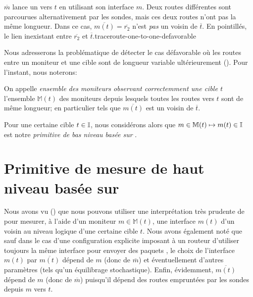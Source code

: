  {$\overline{m}$ lance un \traceroute vers $t$ en
utilisant son interface $m$.
Deux routes différentes sont parcourues alternativement par les sondes, mais ces deux routes
n'ont pas la même longueur. Dans ce cas, $\overline{m(t)} = \overline{r_2}$
n'est {\em pas} un voisin de $\overline{t}$. En pointillés, le lien inexistant
entre $\overline{r_2}$ et $\overline{t}$.}{traceroute-one-to-one-defavorable}

Nous adresserons la problématique de détecter le cas défavorable où les routes
entre un moniteur et une cible sont de longueur variable ultérieurement
(). Pour l'instant, nous noterons:

\begin{definition} On
appelle {\em ensemble des moniteurs observant correctemment une cible $t$}
l'ensemble $\mathbb{M}(t)$ des moniteurs depuis lesquels toutes les routes vers
$t$ sont de même longueur; en particulier tels que $\overline{m(t)}$ est un
voisin de $\overline{t}$.
\end{definition} 

Pour une certaine cible $t \in \mathbb{I}$, nous considérons alors que $m \in
{\mathbb{M}(t)} \mapsto m(t) \in \mathbb{I}$ est notre {\em primitive de bas niveau
basée sur \traceroute}.

\section{Primitive de mesure de haut niveau basée sur \traceroute}
\label{sec:traceroute-many-to-one}

Nous avons vu () que nous pouvons utiliser une
interprétation très prudente de \traceroute pour mesurer, à l'aide d'un moniteur
$m \in \mathbb{M}(t)$, une interface $m(t)$ d'un voisin au niveau logique d'une
certaine cible $t$. Nous avons également noté que sauf dans le cas d'une
configuration explicite imposant à un routeur d'utiliser toujours la même
interface pour envoyer des paquets \icmptimeout, le choix de l'interface $m(t)$
par $\overline{m(t)}$ dépend de $m$ (donc de $\overline{m}$) et éventuellement
d'autres paramètres (tels qu'un équilibrage stochastique).
Enfin, évidemment, $\overline{m(t)}$ dépend de $m$ (donc de $\overline{m}$)
puisqu'il dépend des routes empruntées par les sondes \traceroute depuis $m$
vers $t$.

